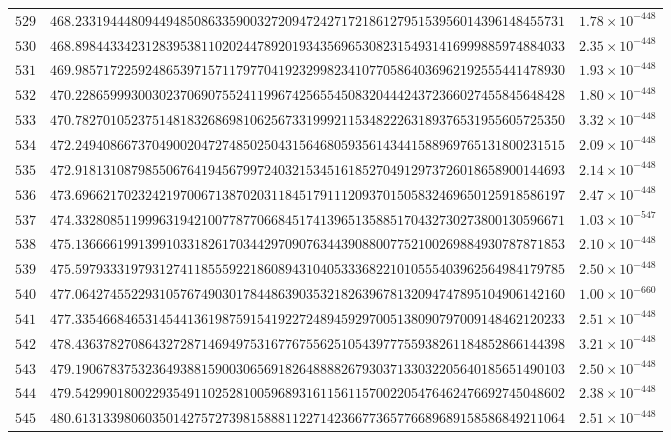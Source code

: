 \documentclass[12pt,reqno]{amsart}
\theoremstyle{remark}
\begin{document}
\begin{longtable}{clc}
$529$ & $468.2331944480944948508633590032720947242717218612795153956014396148455731$ & $1.78\times 10^{-448}$ \\
$530$ & $468.8984433423128395381102024478920193435696530823154931416999885974884033$ & $2.35\times 10^{-448}$ \\
$531$ & $469.9857172259248653971571179770419232998234107705864036962192555441478930$ & $1.93\times 10^{-448}$ \\
$532$ & $470.2286599930030237069075524119967425655450832044424372366027455845648428$ & $1.80\times 10^{-448}$ \\
$533$ & $470.7827010523751481832686981062567331999211534822263189376531955605725350$ & $3.32\times 10^{-448}$ \\
$534$ & $472.2494086673704900204727485025043156468059356143441588969765131800231515$ & $2.09\times 10^{-448}$ \\
$535$ & $472.9181310879855067641945679972403215345161852704912973726018658900144693$ & $2.14\times 10^{-448}$ \\
$536$ & $473.6966217023242197006713870203118451791112093701505832469650125918586197$ & $2.47\times 10^{-448}$ \\
$537$ & $474.3328085119996319421007787706684517413965135885170432730273800130596671$ & $1.03\times 10^{-547}$ \\
$538$ & $475.1366661991399103318261703442970907634439088007752100269884930787871853$ & $2.10\times 10^{-448}$ \\
$539$ & $475.5979333197931274118555922186089431040533368221010555403962564984179785$ & $2.50\times 10^{-448}$ \\
$540$ & $477.0642745522931057674903017844863903532182639678132094747895104906142160$ & $1.00\times 10^{-660}$ \\
$541$ & $477.3354668465314544136198759154192272489459297005138090797009148462120233$ & $2.51\times 10^{-448}$ \\
$542$ & $478.4363782708643272871469497531677675562510543977755938261184852866144398$ & $3.21\times 10^{-448}$ \\
$543$ & $479.1906783753236493881590030656918264888826793037133032205640185651490103$ & $2.50\times 10^{-448}$ \\
$544$ & $479.5429901800229354911025281005968931611561157002205476462476692745048602$ & $2.38\times 10^{-448}$ \\
$545$ & $480.6131339806035014275727398158881122714236677365776689689158586849211064$ & $2.51\times 10^{-448}$ \\

\end{longtable}
\end{document}
